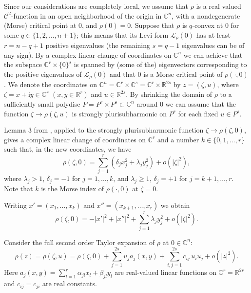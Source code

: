 \documentclass[11pt]{amsart}
\numberwithin{equation}{section}
\theoremstyle{definition}
\begin{document}
Since our considerations are completely local,
we assume that $\rho$ is a real valued ${\mathcal{C}}^2$-function in an 
open neighborhood of the origin in ${\mathbb{C}}^n$, with a 
nondegenerate (Morse) critical point at $0$, and $\rho(0)=0$.
Suppose that $\rho$ is $q$-convex at $0$ for some 
$q\in\{1,2,\ldots,n+1\}$; this means that its Levi form
${\mathcal{L}}_\rho(0)$ has at least $r=n-q+1$ positive eigenvalues
(the remaining $s=q-1$ eigenvalues can be of any sign). 
By a complex linear change of coordinates on ${\mathbb{C}}^n$ we can achieve
that the subspace ${\mathbb{C}}^r\times \{0\}^s$ is spanned
by (some of the) eigenvectors corresponding to the positive eigenvalues 
of ${\mathcal{L}}_\rho(0)$ and that $0$ is a Morse critical point of
$\rho(\cdotp,0)$. We denote the coordinates
on ${\mathbb{C}}^n={\mathbb{C}}^r\times {\mathbb{C}}^s= {\mathbb{C}}^r \times {\mathbb{R}}^{2s}$ by $z=(\zeta,u)$,
where $\zeta=x+\mathrm{i}y\in {\mathbb{C}}^r$ $(x,y\in{\mathbb{R}}^r)$ and $u\in{\mathbb{R}}^{2s}$.
By shrinking the domain of $\rho$ to a sufficiently 
small polydisc $P=P^r \times P^s \subset {\mathbb{C}}^n$ around $0$ 
we can assume that the function $\zeta\to \rho(\zeta,u)$ is strongly
plurisubharmonic on $P^r$ for each fixed $u \in P^s$.

Lemma 3 from \cite{HW}, applied to the strongly plurisubharmonic
function $\zeta \to \rho(\zeta,0)$, 
gives a complex linear change of coordinates on ${\mathbb{C}}^r$ 
and a number $k\in \{0,1,\ldots, r\}$ such that,
in the new coordinates, we have
\[
	\rho(\zeta,0) = \sum_{j=1}^r (\delta_j x_j^2 + \lambda_j y_j^2)  +o(|\zeta|^2),
\]
where $\lambda_j>1$, $\delta_j=-1$ for $j=1,\ldots,k$,
and $\lambda_j\ge 1$, $\delta_j=+1$ for $j=k+1,\ldots,r$. 
Note that $k$ is the Morse index of $\rho(\cdotp,0)$ at 
$\zeta=0$.

Writing $x'=(x_1,\ldots,x_k)$ and $x''=(x_{k+1},\ldots,x_r)$ we obtain
\[
	 \rho(\zeta,0) =  - |x'|^2 + |x''|^2 + \sum_{j=1}^r \lambda_j y_j^2 + o(|\zeta|^2). 
\]

Consider the full second order Taylor expansion of $\rho$ at $0\in{\mathbb{C}}^n$:
\[
	\rho(z)= \rho(\zeta,u)= \rho(\zeta,0) + \sum_{j=1}^{2s} u_j a_j(x,y) +
		\sum_{i,j=1}^{2s} c_{ij}\, u_i u_j  + o(|z|^2).
\]
Here $a_j(x,y)= \sum_{l=1}^r \alpha_{jl} x_l+\beta_{jl} y_l$ 
are real-valued linear functions on ${\mathbb{C}}^r={\mathbb{R}}^{2r}$ 
and $c_{ij}=c_{ji}$ are real constants. 
\end{document}
